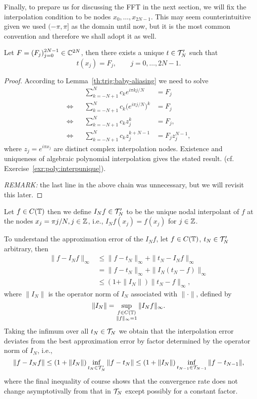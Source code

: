 Finally, to prepare us for discussing the FFT in the next section, we will
fix the interpolation condition to be nodes $x_0, \dots, x_{2N-1}$. This may seem 
counterintuitive given we used $(-\pi, \pi]$ as the domain until now, but it is 
the most common convention and therefore we shall adopt it as well. 

\begin{lemma}
  Let $F  = (F_j)_{j = 0}^{2N-1} \in \mathbb{C}^{2N}$, then there exists a unique
  $t \in \mathcal{T}_N'$ such that
  \[
    t(x_j) = F_j, \qquad j = 0, \dots, 2N-1.
  \]
\end{lemma}
\begin{proof}
  According to Lemma~\ref{th:trig:baby-aliasing} we need to solve
  \begin{align*}
      && \sum_{k = -N+1}^N c_k e^{i\pi k j/N} &= F_j \\
      \Leftrightarrow &&
      \sum_{k = -N+1}^N c_k \big(e^{i\pi j/N}\big)^k &= F_j \\
      \Leftrightarrow &&
      \sum_{k = -N+1}^N c_k z_j^k &= F_j, \\
      \Leftrightarrow &&
      \sum_{k = -N+1}^N c_k z_j^{k+N-1} &= F_j z_j^{N-1},
  \end{align*}
  where $z_j = e^{i\pi x_j}$ are distinct complex interpolation nodes. Existence
  and uniqueness of algebraic polynomial interpolation gives the stated result.
  (cf. Exercise~\ref{exr:poly:interpunique}).

  {\it REMARK: } the last line in the above chain was unnecessary, but we will
  revisit this later.
\end{proof}

\medskip

\begin{definition}
  Let $f \in C(\mathbb{T})$ then we define $I_N f \in \mathcal{T}_N'$ to be the unique nodal
  interpolant of $f$ at the nodes $x_j = \pi j / N, j \in \mathbb{Z}$, i.e., $I_N f(x_j)
  = f(x_j)$ for $j \in \mathbb{Z}$.
\end{definition}

\medskip 

To understand the approximation error of the $I_N f$, let $f \in C(\mathbb{T})$, $t_N
\in \mathcal{T}_N'$ arbitrary, then
\begin{align*}
  \|f - I_N f \|_\infty &\leq \|f - t_N \|_\infty + \| t_N - I_N f\|_\infty \\
    & = \|f - t_N \|_\infty + \| I_N (t_N - f) \|_\infty \\
    & \leq (1 + \|I_N\|) \| t_N - f \|_\infty,
\end{align*}
where $\|I_N\|$ is the operator norm of $I_N$ associated with $\|\cdot\|$,
defined by
\[
    \| I_N \| = \sup_{\substack{f \in C(\mathbb{T}) \\ \|f\|_\infty = 1}} \| I_N f \|_\infty.
\]
Taking the infimum over all $t_N \in \mathcal{T}_N$ we obtain that the
interpolation error deviates from the best approximation error by
factor determined by the operator norm of $I_N$, i.e.,
\[
    \|f - I_N f \| \leq (1 + \|I_N\|) \inf_{t_N \in \mathcal{T}_N'} \|f - t_N \|
    \leq (1 + \|I_N\|) \inf_{t_{N-1} \in \mathcal{T}_{N-1}} \|f - t_{N-1} \|,
\]
where the final inequality of course shows that the convergence rate does not
change asymptotivally from that in $\mathcal{T}_N$ except possibly for a constant
factor.

